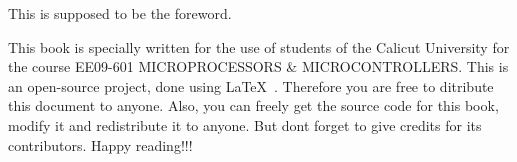 \begin{foreword}
This is supposed to be the foreword.

This book is specially written for the use of students of the Calicut University
for the course EE09-601 MICROPROCESSORS \& MICROCONTROLLERS. This is an
open-source project, done using \LaTeX\ . Therefore you are free to ditribute
this document to anyone. Also, you can freely get the source code for this book,
modify it
and redistribute it to anyone. But dont forget to give credits for its
contributors. Happy reading!!!
\end{foreword}